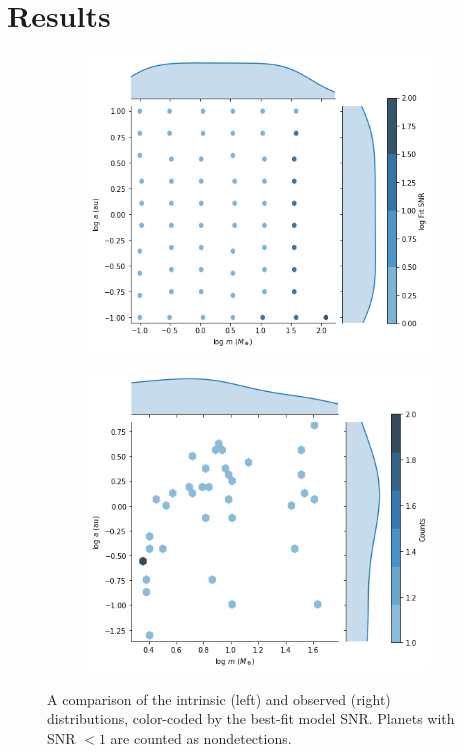 \documentclass[12pt,manuscript]{aastex}
\begin{document}
\section{Results}
\label{section: results}

\begin{figure}[h]
  \centering
  
  \begin{subfigure}[b]{.45\linewidth}
  \includegraphics[width=\linewidth]{../figures/planets2_intrinsic}
  \end{subfigure}
  \begin{subfigure}[b]{.45\linewidth}
  \includegraphics[width=\linewidth]{../figures/planets2_observed}
  \end{subfigure}
  \caption{A comparison of the intrinsic (left) and observed (right) distributions, color-coded by the best-fit model SNR. Planets with SNR $< 1$ are counted as nondetections.}
  \label{}
\end{figure}
\end{document}

